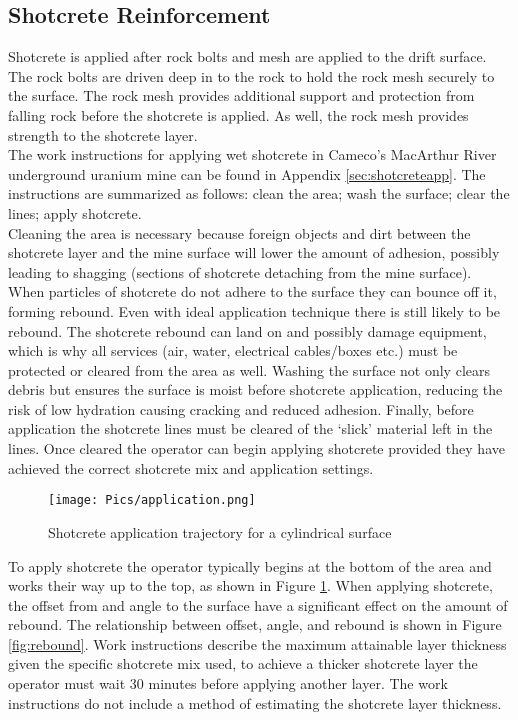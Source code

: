 \subsection{Shotcrete Reinforcement}

Shotcrete is applied after rock bolts and mesh are applied to the drift surface. The rock bolts are driven deep in to the rock to hold the rock mesh securely to the surface. The rock mesh provides additional support and protection from falling rock before the shotcrete is applied. As well, the rock mesh provides strength to the shotcrete layer.\\

The work instructions for applying wet shotcrete in Cameco's MacArthur River underground uranium mine can be found in Appendix \ref{sec:shotcreteapp}. The instructions are summarized as follows: clean the area; wash the surface; clear the lines; apply shotcrete.\\

Cleaning the area is necessary because foreign objects and dirt between the shotcrete layer and the mine surface will lower the amount of adhesion, possibly leading to shagging (sections of shotcrete detaching from the mine surface). When particles of shotcrete do not adhere to the surface they can bounce off it, forming rebound. Even with ideal application technique there is still likely to be rebound. The shotcrete rebound can land on and possibly damage equipment, which is why all services (air, water, electrical cables/boxes etc.) must be protected or cleared from the area as well. Washing the surface not only clears debris but ensures the surface is moist before shotcrete application, reducing the risk of low hydration causing cracking and reduced adhesion. Finally, before application the shotcrete lines must be cleared of the `slick' material left in the lines. Once cleared the operator can begin applying shotcrete provided they have achieved the correct shotcrete mix and application settings.\\

\begin{figure}[h!]
    \centering
    \texttt{[image: Pics/application.png]}
    \caption{Shotcrete application trajectory for a cylindrical surface\cite{camedoc}}
    \label{fig:instshot}
\end{figure}

To apply shotcrete the operator typically begins at the bottom of the area and works their way up to the top, as shown in Figure \ref{fig:instshot}. When applying shotcrete, the offset from and angle to the surface have a significant effect on the amount of rebound. The relationship between offset, angle, and rebound is shown in Figure \ref{fig:rebound}. Work instructions describe the maximum attainable layer thickness given the specific shotcrete mix used, to achieve a thicker shotcrete layer the operator must wait 30 minutes before applying another layer. The work instructions do not include a method of estimating the shotcrete layer thickness.\\

